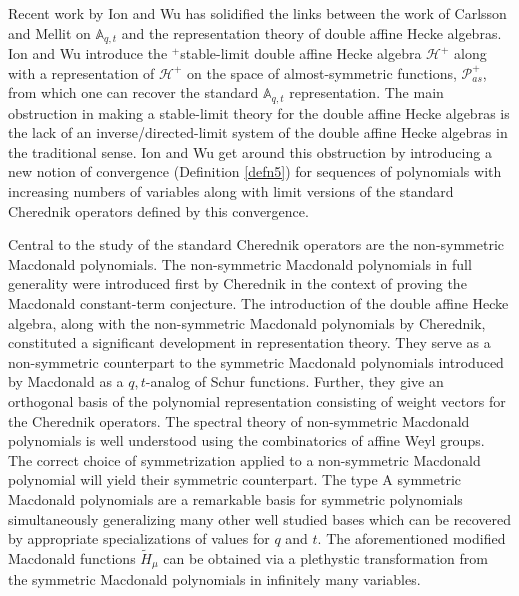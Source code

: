 \documentclass[11pt]{article}
\theoremstyle{definition}
\numberwithin{equation}{section}
\begin{document}
Recent work by Ion and Wu \cite{Ion_2022} has solidified the links between the work of Carlsson and Mellit on $\mathbb{A}_{q,t}$ and the representation theory of double affine Hecke algebras. Ion and Wu introduce the $^+$stable-limit double affine Hecke algebra $\mathscr{H}^{+}$ along with a representation of $\mathscr{H}^{+}$ on the space of almost-symmetric functions, $\mathscr{P}_{as}^{+}$, from which one can recover the standard $\mathbb{A}_{q,t}$ representation. The main obstruction in making a stable-limit theory for the double affine Hecke algebras is the lack of an inverse/directed-limit system of the double affine Hecke algebras in the traditional sense. Ion and Wu get around this obstruction by introducing a new notion of convergence (Definition \ref{defn5}) for sequences of polynomials with increasing numbers of variables along with limit versions of the standard Cherednik operators defined by this convergence. 

Central to the study of the standard Cherednik operators are the non-symmetric Macdonald polynomials. The non-symmetric Macdonald polynomials in full generality were introduced first by Cherednik \cite{C_2003} in the context of proving the Macdonald constant-term conjecture. The introduction of the double affine Hecke algebra, along with the non-symmetric Macdonald polynomials by Cherednik, constituted a significant development in representation theory. They serve as a non-symmetric counterpart to the symmetric Macdonald polynomials introduced by Macdonald as a $q,t$-analog of Schur functions. Further, they give an orthogonal basis of the polynomial representation consisting of weight vectors for the Cherednik operators. The spectral theory of non-symmetric Macdonald polynomials is well understood using the combinatorics of affine Weyl groups. The correct choice of symmetrization applied to a non-symmetric Macdonald polynomial will yield their symmetric counterpart. The type A symmetric Macdonald polynomials are a remarkable basis for symmetric polynomials simultaneously generalizing many other well studied bases which can be recovered by appropriate specializations of values for $q$ and $t$. The aforementioned modified Macdonald functions $\widetilde{H}_{\mu}$ can be obtained via a plethystic transformation from the symmetric Macdonald polynomials in infinitely many variables.
\end{document}

